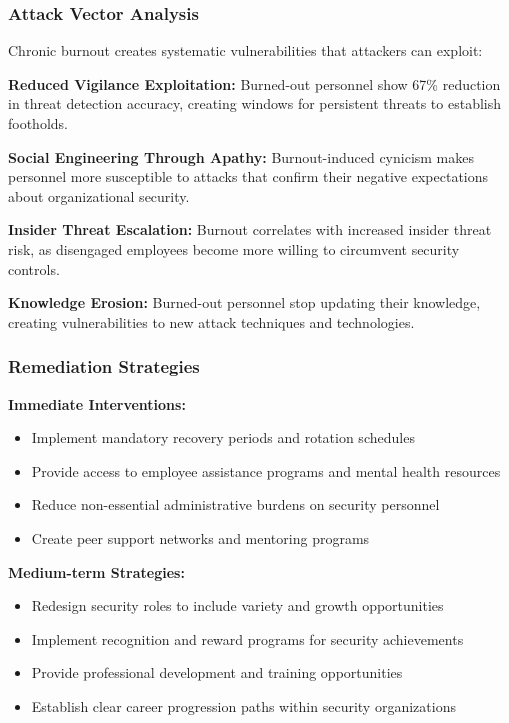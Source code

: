 \documentclass[11pt,a4paper]{article}
\begin{document}
\subsubsection{Attack Vector Analysis}

Chronic burnout creates systematic vulnerabilities that attackers can exploit:

\textbf{Reduced Vigilance Exploitation:} Burned-out personnel show 67\% reduction in threat detection accuracy, creating windows for persistent threats to establish footholds\cite{burnout2022}.

\textbf{Social Engineering Through Apathy:} Burnout-induced cynicism makes personnel more susceptible to attacks that confirm their negative expectations about organizational security\cite{cynicism2021}.

\textbf{Insider Threat Escalation:} Burnout correlates with increased insider threat risk, as disengaged employees become more willing to circumvent security controls\cite{insider2023}.

\textbf{Knowledge Erosion:} Burned-out personnel stop updating their knowledge, creating vulnerabilities to new attack techniques and technologies\cite{knowledge2022}.

\subsubsection{Remediation Strategies}

\textbf{Immediate Interventions:}
\begin{itemize}
\item Implement mandatory recovery periods and rotation schedules
\item Provide access to employee assistance programs and mental health resources
\item Reduce non-essential administrative burdens on security personnel
\item Create peer support networks and mentoring programs
\end{itemize}

\textbf{Medium-term Strategies:}
\begin{itemize}
\item Redesign security roles to include variety and growth opportunities
\item Implement recognition and reward programs for security achievements
\item Provide professional development and training opportunities
\item Establish clear career progression paths within security organizations
\end{itemize}
\end{document}
